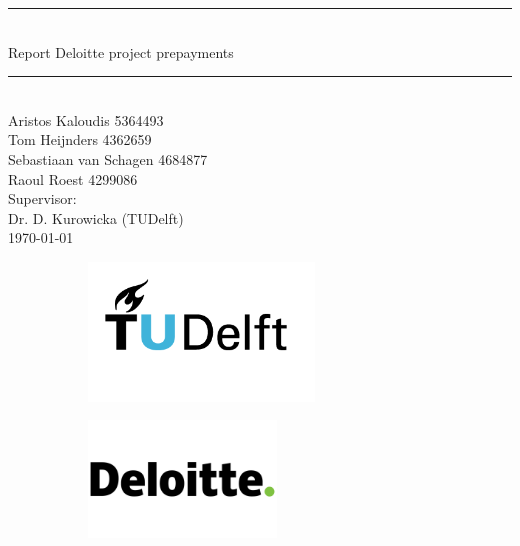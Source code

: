 \documentclass[11pt,titlepage,a4paper]{article}
\begin{document}
    \begin{titlepage}
        \vspace*{\fill}
        \centering
        \par\noindent\rule{\textwidth}{0.4pt} \\[0.7cm]
        
        {
            \Huge Report Deloitte project prepayments 
        }\\[0.5cm]
        
        \par\noindent\rule{\textwidth}{0.4pt}\\[1cm]
        
        {\large 
            Aristos Kaloudis 5364493 \\
            Tom Heijnders 4362659 \\
            Sebastiaan van Schagen 4684877 \\
            Raoul Roest 4299086
        }\\[0.6cm]

        {
            \large Supervisor:\\ 
            Dr. D. Kurowicka (TUDelft)
        }\\[1cm]
        
        \today\\[5cm]
        
        \begin{figure}[h]    
            \centering
            \begin{subfigure}{0.45\textwidth}
                \includegraphics[width=6cm]{Figures/TU_Delft_logo_RGB.png}
            \end{subfigure}
    
            \begin{subfigure}{0.45\textwidth}
                \includegraphics[width=5cm]{Figures/Logo_Deloitte.png}
            \end{subfigure}
        \end{figure}
    
        \vfill
    
    \end{titlepage}
\end{document}
